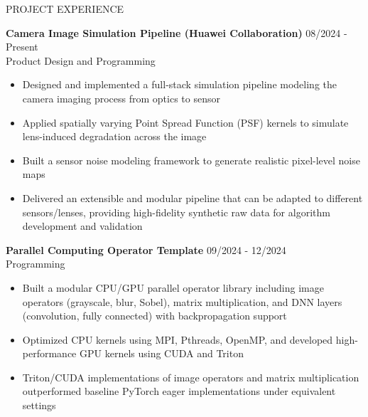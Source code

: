 \documentclass{resume} %
\begin{document}

\begin{rSection}{PROJECT EXPERIENCE}

\setlength{\parskip}{1.5pt}

\textbf{Camera Image Simulation Pipeline (Huawei Collaboration)} \hfill 08/2024 - Present\\
Product Design and Programming
\begin{itemize}
    \setlength{\itemsep}{0pt}
    \setlength{\parsep}{0pt}
    \setlength{\parskip}{0pt}
    \item Designed and implemented a full-stack simulation pipeline modeling the camera imaging process from optics to sensor
    \item Applied spatially varying Point Spread Function (PSF) kernels to simulate lens-induced degradation across the image
    \item Built a sensor noise modeling framework to generate realistic pixel-level noise maps
    \item Delivered an extensible and modular pipeline that can be adapted to different sensors/lenses, providing high-fidelity synthetic raw data for algorithm development and validation
\end{itemize}

\textbf{Parallel Computing Operator Template} \hfill 09/2024 - 12/2024\\
Programming
\begin{itemize}
    \setlength{\itemsep}{0pt}
    \setlength{\parsep}{0pt}
    \setlength{\parskip}{0pt}
    \item Built a modular CPU/GPU parallel operator library including image operators (grayscale, blur, Sobel), matrix multiplication, and DNN layers (convolution, fully connected) with backpropagation support
    \item Optimized CPU kernels using MPI, Pthreads, OpenMP, and developed high-performance GPU kernels using CUDA and Triton
    \item Triton/CUDA implementations of image operators and matrix multiplication outperformed baseline PyTorch eager implementations under equivalent settings
\end{itemize}


\end{rSection}
\end{document}
